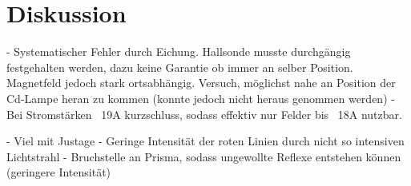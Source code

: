 \section{Diskussion}
\label{sec:Diskussion}

- Systematischer Fehler durch Eichung. Hallsonde musste durchgängig festgehalten werden,
dazu keine Garantie ob immer an selber Position. Magnetfeld jedoch stark ortsabhängig.
Versuch, möglichst nahe an Position der Cd-Lampe heran zu kommen (konnte jedoch nicht heraus genommen werden)
- Bei Stromstärken ~19A kurzschluss, sodass effektiv nur Felder bis ~18A nutzbar.

- Viel mit Justage
- Geringe Intensität der roten Linien durch nicht so intensiven Lichtstrahl
- Bruchstelle an Prisma, sodass ungewollte Reflexe entstehen können (geringere Intensität)
